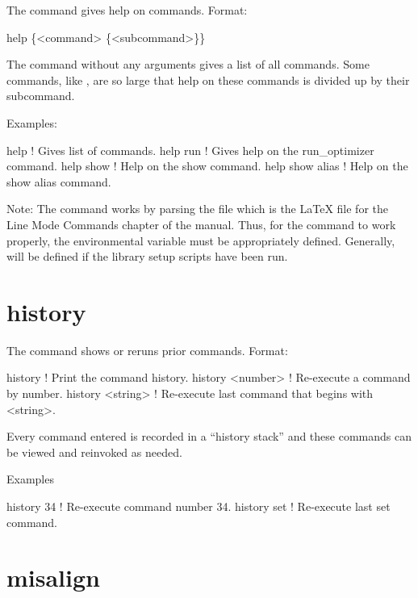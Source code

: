 The  command gives help on \tao commands. Format:
\begin{example}
  help \{<command> \{<subcommand>\}\}
\end{example}

\vskip 0.2in

The  command without any arguments gives a list of all commands.
Some commands, like , are so large that help on these commands
is divided up by their subcommand.

Examples:
\begin{example}
  help            ! Gives list of commands.
  help run        ! Gives help on the run_optimizer command.
  help show       ! Help on the show command.
  help show alias ! Help on the show alias command.
\end{example}

Note: The  command works by parsing the file
 which is the LaTeX file for the
Line Mode Commands chapter of the \tao manual. Thus, for the 
command to work properly, the environmental variable  must
be appropriately defined. Generally,  will be defined if
the \bmad library setup scripts have been run.

\section{history}
\label{s:history}

The  command shows or reruns prior commands.  Format:
\begin{example}
  history           ! Print the command history.
  history <number>  ! Re-execute a command by number.
  history <string>  ! Re-execute last command that begins with <string>.
\end{example}

\vskip 0.2in
Every \tao command entered is recorded in a ``history stack'' and
these commands can be viewed and reinvoked as needed. 

Examples
\begin{example}
  history 34   ! Re-execute command number 34.
  history set  ! Re-execute last set command.  
\end{example}

\section{misalign}
\label{s:misalign}

